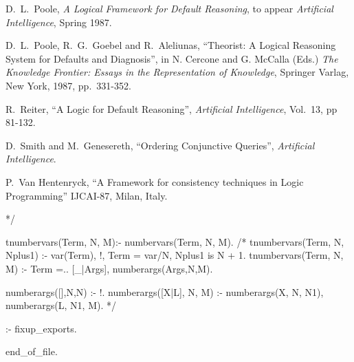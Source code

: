 \begin{thebibliography}{McDer80}
D.\ L.\ Poole,
{\it A Logical Framework for Default Reasoning},
to appear {\em Artificial Intelligence}, Spring 1987.

D.\ L.\ Poole, R.\ G.\ Goebel and R.\ Aleliunas,
``Theorist: A Logical Reasoning System for Defaults and Diagnosis'',
in N. Cercone and G. McCalla (Eds.)
{\it The Knowledge Frontier: Essays in the Representation of
Knowledge},
Springer Varlag, New York, 1987, pp.\ 331-352.

R.\ Reiter,
``A Logic for Default Reasoning'',
{\em Artificial Intelligence},
Vol.\ 13, pp 81-132.

D.~Smith and M.~Genesereth,
``Ordering Conjunctive Queries'',
{\em Artificial Intelligence}.

P.\ Van Hentenryck,
``A Framework for consistency techniques in Logic Programming''
IJCAI-87, Milan, Italy.
\end{thebibliography}
\printindex

*/

tnumbervars(Term, N, M):- numbervars(Term, N, M).
/*
tnumbervars(Term, N, Nplus1) :-
  var(Term), !,
  Term = var/N,
  Nplus1 is N + 1.
tnumbervars(Term, N, M) :-
  Term =.. [_|Args],
  numberargs(Args,N,M).

numberargs([],N,N) :- !.
numberargs([X|L], N, M) :-
  numberargs(X, N, N1),
  numberargs(L, N1, M).      
*/

:- fixup_exports.


end_of_file.

